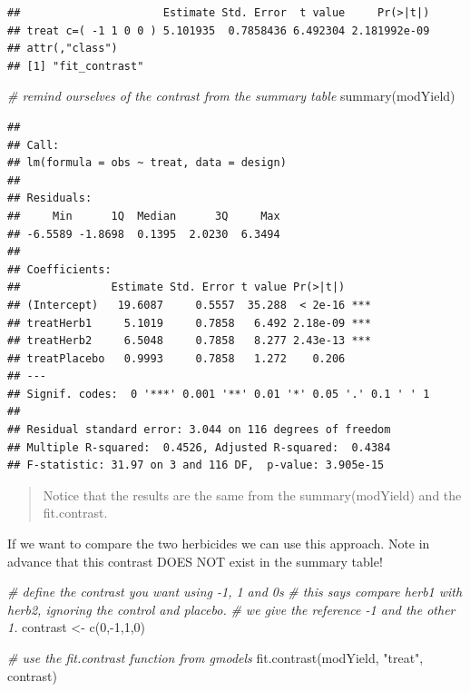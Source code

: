 \documentclass[
]{book}
\newenvironment{Shaded}{\begin{snugshade}}{\end{snugshade}}
\newcommand{\CommentTok}[1]{\textcolor[rgb]{0.56,0.35,0.01}{\textit{#1}}}
\newcommand{\DecValTok}[1]{\textcolor[rgb]{0.00,0.00,0.81}{#1}}
\newcommand{\FunctionTok}[1]{\textcolor[rgb]{0.00,0.00,0.00}{#1}}
\newcommand{\NormalTok}[1]{#1}
\newcommand{\OtherTok}[1]{\textcolor[rgb]{0.56,0.35,0.01}{#1}}
\newcommand{\SpecialCharTok}[1]{\textcolor[rgb]{0.00,0.00,0.00}{#1}}
\newcommand{\StringTok}[1]{\textcolor[rgb]{0.31,0.60,0.02}{#1}}
\begin{document}
\begin{verbatim}
##                      Estimate Std. Error  t value     Pr(>|t|)
## treat c=( -1 1 0 0 ) 5.101935  0.7858436 6.492304 2.181992e-09
## attr(,"class")
## [1] "fit_contrast"
\end{verbatim}

\begin{Shaded}
\begin{Highlighting}[]
\CommentTok{\# remind ourselves of the contrast from the summary table}
\FunctionTok{summary}\NormalTok{(modYield)}
\end{Highlighting}
\end{Shaded}

\begin{verbatim}
## 
## Call:
## lm(formula = obs ~ treat, data = design)
## 
## Residuals:
##     Min      1Q  Median      3Q     Max 
## -6.5589 -1.8698  0.1395  2.0230  6.3494 
## 
## Coefficients:
##              Estimate Std. Error t value Pr(>|t|)    
## (Intercept)   19.6087     0.5557  35.288  < 2e-16 ***
## treatHerb1     5.1019     0.7858   6.492 2.18e-09 ***
## treatHerb2     6.5048     0.7858   8.277 2.43e-13 ***
## treatPlacebo   0.9993     0.7858   1.272    0.206    
## ---
## Signif. codes:  0 '***' 0.001 '**' 0.01 '*' 0.05 '.' 0.1 ' ' 1
## 
## Residual standard error: 3.044 on 116 degrees of freedom
## Multiple R-squared:  0.4526, Adjusted R-squared:  0.4384 
## F-statistic: 31.97 on 3 and 116 DF,  p-value: 3.905e-15
\end{verbatim}

\begin{quote}
Notice that the results are the same from the summary(modYield) and the fit.contrast.
\end{quote}

If we want to compare the two herbicides we can use this approach. Note in advance that this contrast DOES NOT exist in the summary table!

\begin{Shaded}
\begin{Highlighting}[]
\CommentTok{\# define the contrast you want using {-}1, 1 and 0\textquotesingle{}s}
\CommentTok{\# this says compare herb1 with herb2, ignoring the control and placebo.}
\CommentTok{\# we give the reference {-}1 and the \textquotesingle{}other\textquotesingle{} 1.}
\NormalTok{contrast }\OtherTok{\textless{}{-}} \FunctionTok{c}\NormalTok{(}\DecValTok{0}\NormalTok{,}\SpecialCharTok{{-}}\DecValTok{1}\NormalTok{,}\DecValTok{1}\NormalTok{,}\DecValTok{0}\NormalTok{)}

\CommentTok{\# use the fit.contrast function from gmodels}
\FunctionTok{fit.contrast}\NormalTok{(modYield, }\StringTok{"treat"}\NormalTok{, contrast)}
\end{Highlighting}
\end{Shaded}
\end{document}
